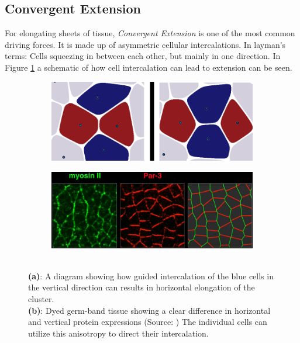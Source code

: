 \subsection{Convergent Extension}
\label{sec:ConvergentExtension}
For elongating sheets of tissue, \textit{Convergent Extension} is one of the most common driving forces. It is made up of asymmetric cellular intercalations. In layman's terms: Cells squeezing in between each other, but mainly in one direction. 
In Figure  \ref{fig:cellIntercolation} a schematic of how cell intercalation can lead to extension can be seen.
\begin{figure}[H]
    \centering
    \begin{subfigure}{0.45\linewidth}
        \centering
    \includegraphics[width=\linewidth]{chapters/Theory/figures/ConvergentExtensionDiagram.png}
    \caption{}
    \label{fig:cellIntercolation}
    \end{subfigure}
        \begin{subfigure}{0.45\linewidth}
        \centering
    \includegraphics[width=\linewidth]{chapters/Theory/figures/bipolar-PCP.png}
        \caption{}
    \label{fig:dyedDifferentialWall}
    \end{subfigure}
    \caption{\\\textbf{(a)}: A diagram showing how guided intercalation of the blue cells in the vertical direction can results in horizontal elongation of the cluster. \\\textbf{(b)}: Dyed germ-band tissue showing a clear difference in horizontal and vertical protein expressions (Source: ) The individual cells can utilize this anisotropy to direct their intercalation.}
    
    \label{fig:ConvergentExtensionDiagram}
\end{figure}

